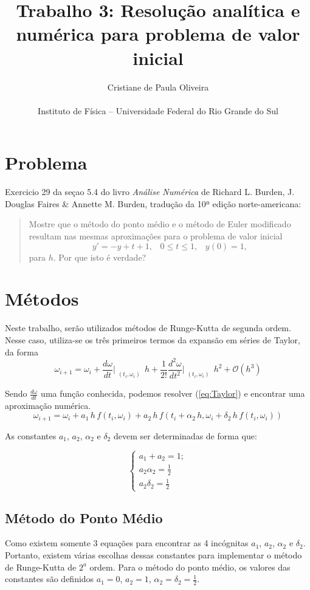 \documentclass[brazilian, 12pt, a4paper, final]{article}
\title{\textbf{Trabalho 3: Resolução analítica e numérica para problema de valor inicial}}
\author{Cristiane de Paula Oliveira\\\\\small{Instituto de Física -- Universidade Federal do Rio Grande do Sul}}
\begin{document}
\maketitle

\section{Problema}
Exercicio 29 da seçao 5.4 do livro {\em Análise Numérica} de Richard L. Burden, J. Douglas Faires \& Annette M. Burden, tradução da 10ª edição norte-americana:
\begin{quote}
  Mostre que o método do ponto médio e o método de Euler modificado resultam nas mesmas aproximações para o problema de valor inicial
  \begin{equation*}
    y'=-y+t+1, \;\;\; 0\le t \le 1, \;\;\; y(0)=1,
  \end{equation*}
  \noindent
  para  $h$. Por que isto é verdade?
\end{quote}

\section{Métodos}
Neste trabalho, serão utilizados métodos de Runge-Kutta de segunda ordem. Nesse caso, utiliza-se os três primeiros termos da expansão em séries de Taylor, da forma
\begin{equation}\label{eq:Taylor}
  \omega_{i+1}=\omega_{i} + \frac{d\omega}{dt}\Bigr|_{\substack{(t_i,\omega_i)}}\,h + \frac{1}{2!} \frac{d^2\omega}{dt^2}\Bigr|_{\substack{(t_i,\omega_i)}}\, h^2 + \mathcal{O}(h^3)
\end{equation}

Sendo $\frac{d\omega}{dt}$ uma função conhecida, podemos resolver (\ref{eq:Taylor}) e encontrar uma aproximação numérica.
\begin{equation}\label{eq:RK}
  \omega_{i+1}=\omega_{i}+a_1\,h\,f(t_i,\omega_i) + a_2\,h\,f(t_i+\alpha_2\,h, \omega_i+\delta_2\,h\,f(t_i,\omega_i))
\end{equation}

As constantes $a_1$, $a_2$, $\alpha_2$ e $\delta_2$ devem ser determinadas de forma que:

\[
\begin{cases}
  a_1+a_2=1;\\
  a_2\alpha_2=\frac{1}{2}\\
  a_2\delta_2=\frac{1}{2}
\end{cases}
\]

\subsection{Método do Ponto Médio}
Como existem somente 3 equações para encontrar as 4 incógnitas $a_1$, $a_2$, $\alpha_2$ e $\delta_2$. Portanto, existem várias escolhas dessas constantes para implementar o método de Runge-Kutta de $2^{a}$ ordem. Para o método do ponto médio, os valores das constantes são definidos $a_1=0$, $a_2=1$, $\alpha_2=\delta_2=\frac{1}{2}$.
\end{document}
